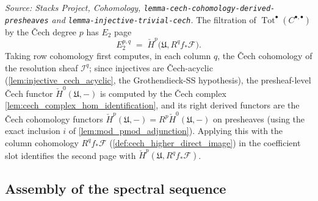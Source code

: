 \begin{lemma}[Second filtration: \(E_2 = \check{H}^p(\mathfrak{U}, R^q f_*\mathcal{F})\)]
  \label{lem:total_complex_second_filtration_E2}
  \textit{Source: Stacks Project, Cohomology,
  \texttt{lemma-cech-cohomology-derived-presheaves} and
  \texttt{lemma-injective-trivial-cech}.}
  The filtration of \(\operatorname{Tot}^\bullet(C^{\bullet,\bullet})\) by the
  {\v C}ech degree \(p\) has \(E_2\) page
  \[
    E_2^{p,q} \;=\; \check{H}^p\bigl(\mathfrak{U}, R^q f_*\mathcal{F}\bigr).
  \]
  Taking row cohomology first computes, in each column \(q\), the {\v C}ech cohomology
  of the resolution sheaf \(\mathcal{I}^q\); since injectives are {\v C}ech-acyclic
  (\cref{lem:injective_cech_acyclic}, the Grothendieck-SS hypothesis), the
  presheaf-level {\v C}ech functor \(\check{H}^0(\mathfrak{U}, -)\) is computed by the
  {\v C}ech complex \cref{lem:cech_complex_hom_identification}, and its right derived
  functors are the {\v C}ech cohomology functors
  \(\check{H}^p(\mathfrak{U}, -) = R^p\check{H}^0(\mathfrak{U}, -)\) on presheaves
  (using the exact inclusion \(i\) of \cref{lem:mod_pmod_adjunction}). Applying this
  with the column cohomology \(R^q f_*\mathcal{F}\)
  (\cref{def:cech_higher_direct_image}) in the coefficient slot identifies the second
  page with \(\check{H}^p(\mathfrak{U}, R^q f_*\mathcal{F})\).
\end{lemma}

\subsection{Assembly of the spectral sequence}

